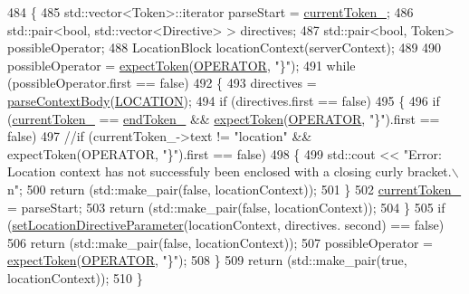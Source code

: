 \begin{DoxyCode}
484     \{
485         std::vector<Token>::iterator parseStart = \hyperlink{classft_1_1_parser_a942c5b794d108f144c5b5028aaa34cb6}{currentToken\_};
486         std::pair<bool, std::vector<Directive> > directives;
487         std::pair<bool, Token> possibleOperator;
488         LocationBlock   locationContext(serverContext);
489 
490         possibleOperator = \hyperlink{classft_1_1_parser_a1615a752d3642bb53598e2c8db810db0}{expectToken}(\hyperlink{namespaceft_aa520fbf142ba1e7e659590c07da31921a6411d9d6073252e4d316493506bbb979}{OPERATOR}, \textcolor{stringliteral}{"\}"});
491         \textcolor{keywordflow}{while} (possibleOperator.first == \textcolor{keyword}{false})
492         \{
493             directives = \hyperlink{classft_1_1_parser_a2d0fd9222eca5d8ea7e8fbb79f0a30be}{parseContextBody}(\hyperlink{namespaceft_a5a5554dff10f0dc50bae4cc5825ad75da1e9e3944b93fde52c7c92e1e15dcaf4a}{LOCATION});
494             \textcolor{keywordflow}{if} (directives.first == \textcolor{keyword}{false})
495             \{
496                 \textcolor{keywordflow}{if} (\hyperlink{classft_1_1_parser_a942c5b794d108f144c5b5028aaa34cb6}{currentToken\_} == \hyperlink{classft_1_1_parser_a538ba3ab8ee1d0cef5cc3c999f3ab44c}{endToken\_} && 
      \hyperlink{classft_1_1_parser_a1615a752d3642bb53598e2c8db810db0}{expectToken}(\hyperlink{namespaceft_aa520fbf142ba1e7e659590c07da31921a6411d9d6073252e4d316493506bbb979}{OPERATOR}, \textcolor{stringliteral}{"\}"}).first == \textcolor{keyword}{false})
497                 \textcolor{comment}{//if (currentToken\_->text != "location" && expectToken(OPERATOR, "\}").first == false)}
498                 \{
499                     std::cout << \textcolor{stringliteral}{"Error: Location context has not successfuly been enclosed with a closing
       curly bracket.\(\backslash\)n"};
500                     \textcolor{keywordflow}{return} (std::make\_pair(\textcolor{keyword}{false}, locationContext));
501                 \}
502                 \hyperlink{classft_1_1_parser_a942c5b794d108f144c5b5028aaa34cb6}{currentToken\_} = parseStart;
503                 \textcolor{keywordflow}{return} (std::make\_pair(\textcolor{keyword}{false}, locationContext));
504             \}
505             \textcolor{keywordflow}{if} (\hyperlink{classft_1_1_parser_a82bee2278db1afa69bbb6eb6f192743c}{setLocationDirectiveParameter}(locationContext, directives.
      second) == \textcolor{keyword}{false})
506                 \textcolor{keywordflow}{return} (std::make\_pair(\textcolor{keyword}{false}, locationContext));
507             possibleOperator = \hyperlink{classft_1_1_parser_a1615a752d3642bb53598e2c8db810db0}{expectToken}(\hyperlink{namespaceft_aa520fbf142ba1e7e659590c07da31921a6411d9d6073252e4d316493506bbb979}{OPERATOR}, \textcolor{stringliteral}{"\}"});
508         \}
509         \textcolor{keywordflow}{return} (std::make\_pair(\textcolor{keyword}{true}, locationContext));
510     \}
\end{DoxyCode}
